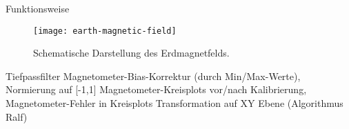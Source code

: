 Funktionsweise

\begin{figure}
   \centering
   \texttt{[image: earth-magnetic-field]}
   \caption[mag_world]{Schematische Darstellung des Erdmagnetfelds.}
   \label{fig:mag_world}
\end{figure}


Tiefpassfilter
Magnetometer-Bias-Korrektur (durch Min/Max-Werte), Normierung auf [-1,1]
Magnetometer-Kreisplots vor/nach Kalibrierung, Magnetometer-Fehler in Kreisplots
Transformation auf XY Ebene (Algorithmus Ralf)


